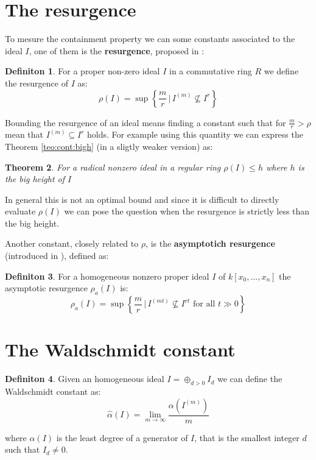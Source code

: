 \documentclass[]{book}
\theoremstyle{plain}
\newtheorem{teo}{Theorem}[section]
\theoremstyle{remark}
\theoremstyle{definition}
\newtheorem{deff}[teo]{Definiton}
\newcommand{\cont}[2]{ I^{(#1)} \subseteq I^{#2}}
\begin{document}
\section{The resurgence}
To mesure the containment property we can some constants associated to the ideal $ I $, one of them is the \textbf{resurgence}, proposed in \cite{Boc09resurgence}:
\begin{deff}
	For a proper non-zero ideal $ I $ in a commutative ring $ R $ we define the resurgence of $ I $ as:
	\begin{equation*}
		\rho(I)= \sup \left\lbrace \frac{m}{r} \, | \, I^{(m)} \not \subseteq I^r \right\rbrace 
	\end{equation*}
\end{deff}
Bounding the resurgence of an ideal means finding a constant such that for $ \frac{m}{r} > \rho $ mean that $ \cont{m}{r} $ holds.
For example using this quantity we can express the Theorem \ref{teo:cont:bigh} (in a sligtly weaker version) as:
\begin{teo}
	For a radical nonzero ideal in a regular ring $ \rho(I) \leq h $ where $ h $ is the big height of $ I $
\end{teo}
In general this is not an optimal bound and since it is difficult to directly evaluate $ \rho(I) $ we can pose the question when the resurgence is strictly less than the big height. 

Another constant, closely related to $ \rho $, is the \textbf{asymptotich resurgence} (introduced in \cite{Guardo2012}), defined as:
\begin{deff}
	For a homogeneous nonzero proper ideal $ I $ of $ k[x_0 , ... , x_n] $ the asymptotic resurgence $ \rho_a(I) $ is:
	\[ \rho_a(I) = \sup \left\lbrace \frac{m}{r} \, | \, I^{(mt)} \not \subseteq I^{rt} \text{ for all } t \gg 0 \right\rbrace \]
\end{deff}


	
\section{The Waldschmidt constant}

\begin{deff}\label{def:walds}
Given an homogeneous ideal $ I = \oplus_{d>0} I_d$ we can define the Waldschmidt constant as:
\[
\hat{\alpha}(I) = \lim_{m \to \infty} \frac{\alpha (I^{(m)})   }{m}
\]

where $ \alpha(I) $ is the least degree of a generator of $ I $, that is the smallest integer $ d $ such that $ I_d \neq 0 $.
\end{deff}
\end{document}
